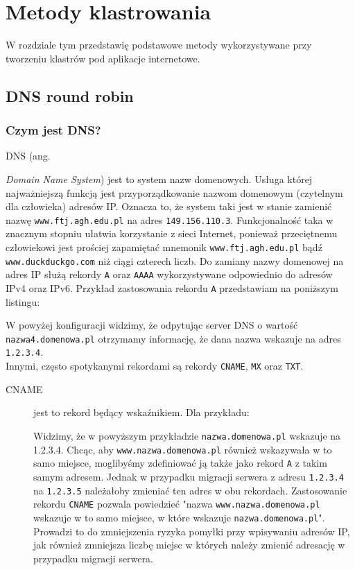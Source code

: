 \chapter{Metody klastrowania}
W rozdziale tym przedstawię podstawowe metody wykorzystywane przy tworzeniu klastrów pod aplikacje internetowe.
\section{DNS round robin}
\label{sec:dns}
\subsection{Czym jest DNS?}
DNS (ang. {\textit{Domain Name System}) jest to system nazw domenowych. Usługa której najważniejszą funkcją jest przyporządkowanie nazwom domenowym (czytelnym dla człowieka) adresów IP.
Oznacza to, że system taki jest w stanie zamienić nazwę \texttt{www.ftj.agh.edu.pl} na adres \texttt{149.156.110.3}.
Funkcjonalność taka w znacznym stopniu ułatwia korzystanie z sieci Internet, ponieważ przeciętnemu człowiekowi jest prościej zapamiętać mnemonik \texttt{www.ftj.agh.edu.pl} bądź \texttt{www.duckduckgo.com} niż ciągi czterech liczb.
Do zamiany nazwy domenowej na adres IP służą rekordy \texttt{A} oraz \texttt{AAAA} wykorzystywane odpowiednio do adresów IPv4 oraz IPv6.
Przykład zastosowania rekordu \texttt{A} przedstawiam na poniższym listingu:

W powyżej konfiguracji widzimy, że odpytując server DNS o wartość \texttt{nazwa4.domenowa.pl} otrzymamy informację, że dana nazwa wskazuje na adres \texttt{1.2.3.4}.\\
Innymi, często spotykanymi rekordami są rekordy \texttt{CNAME}, \texttt{MX} oraz \texttt{TXT}.
\begin{description}
\item[CNAME] jest to rekord będący wskaźnikiem. Dla przykładu:

Widzimy, że w powyższym przykładzie \texttt{nazwa.domenowa.pl} wskazuje na 1.2.3.4.
Chcąc, aby \texttt{www.nazwa.domenowa.pl} również wskazywała w to samo miejsce, moglibyśmy zdefiniować ją także jako rekord \texttt{A} z takim samym adresem.
Jednak w przypadku migracji serwera z adresu \texttt{1.2.3.4} na \texttt{1.2.3.5} należałoby zmieniać ten adres w obu rekordach.
Zastosowanie rekordu \texttt{CNAME} pozwala powiedzieć "nazwa \texttt{www.nazwa.domenowa.pl} wskazuje w to samo miejsce, w które wskazuje \texttt{nazwa.domenowa.pl}".
Prowadzi to do zmniejszenia ryzyka pomyłki przy wpisywaniu adresów IP, jak również zmniejsza liczbę miejsc w których należy zmienić adresację w przypadku migracji serwera.

\end{description}}
